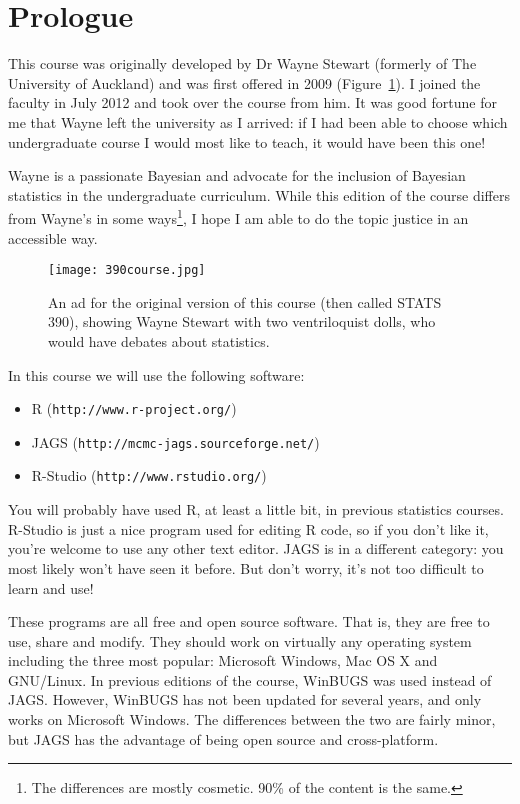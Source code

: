 \section{Prologue}
This course was originally developed by Dr Wayne Stewart (formerly of The
University of
Auckland) and was first offered in 2009 (Figure~\ref{fig:wayne}).
I joined the faculty in July 2012
and took over the course from him. It was good fortune for me that Wayne left
the university as I arrived: if I had been able to choose which undergraduate
course I would most like to teach, it would have been this one!

Wayne is a passionate Bayesian and advocate
for the inclusion of Bayesian statistics in the undergraduate curriculum.
While this edition of the course differs from Wayne's in some ways\footnote{
The differences are mostly cosmetic. 90\% of the content is the same.},
I hope I am able to do the topic justice in an accessible way.

\begin{figure}
\begin{center}
\texttt{[image: 390course.jpg]}
\end{center}
\caption{An ad for the original version of this course (then called
STATS 390), showing Wayne Stewart with two ventriloquist dolls, who would
have debates about statistics.\label{fig:wayne}}
\end{figure}

In this course we will use the following software:
\begin{itemize}
\item R ({\tt http://www.r-project.org/}) \\
\item JAGS ({\tt http://mcmc-jags.sourceforge.net/}) \\
\item R-Studio ({\tt http://www.rstudio.org/})
\end{itemize}
You will probably have used R, at least a little bit, in previous statistics
courses. R-Studio is just a nice program used for editing R code, so if you
don't like it, you're welcome to use any other text editor. JAGS is in a
different category: you most likely won't have seen it before.
But don't worry, it's not too difficult to learn and use!

These programs are all free and open source software.
That is, they are free to use, share and modify. They should work on
virtually any operating system including the three most popular:
Microsoft Windows, Mac OS X and GNU/Linux. In previous editions of the course,
WinBUGS was used instead of JAGS. However, WinBUGS has not been updated for
several years, and only works on Microsoft Windows. The differences between
the two are fairly minor, but JAGS has the advantage of being open source and
cross-platform.

